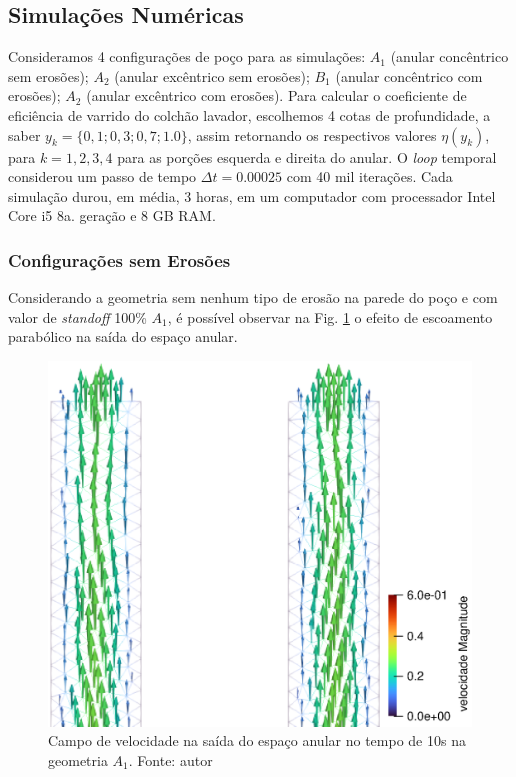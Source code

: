 \subsection{Simulações Numéricas}

Consideramos 4 configurações de poço para as simulações: $A_1$ (anular concêntrico sem erosões); $A_2$ (anular excêntrico sem erosões); $B_1$ (anular concêntrico com erosões); $A_2$ (anular excêntrico com erosões). Para calcular o coeficiente de eficiência de varrido do colchão lavador, escolhemos 4 cotas de profundidade, a saber $y_k = \{0,1; 0,3; 0,7; 1.0\}$, assim retornando os respectivos valores $\eta(y_k)$, para $k=1,2,3,4$ para as porções esquerda e direita do anular. O \textit{loop} temporal considerou um passo de tempo $\Delta t = 0.00025$ com 40 mil iterações. Cada simulação durou, em média, 3 horas, em um computador com processador Intel Core i5 8a. geração e 8 GB RAM.

\subsubsection{Configurações sem Erosões}

Considerando a geometria sem nenhum tipo de erosão na parede do poço e com valor de \textit{standoff} 100\% $A_1$, é possível observar na Fig. \ref{fig:perfil_velocidade_liso_saida_paraview_10s} o efeito de escoamento parabólico na saída do espaço anular.
\begin{figure}[H]
        \centering
    	\includegraphics[scale=0.5]{img/perfil_vel/liso/perfil_de_vel_saida_paraview.eps}
    	\caption[Campo de velocidade na saída do espaço anular no tempo de 10s na geometria $A_1$.]{Campo de velocidade na saída do espaço anular no tempo de 10s na geometria $A_1$. Fonte: autor}
    	\label{fig:perfil_velocidade_liso_saida_paraview_10s}
\end{figure}
    
